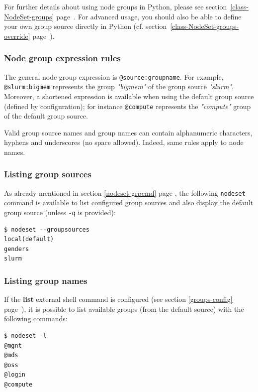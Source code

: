 \documentclass[english,a4paper]{csuserguide}
\newcommand{\nodeset}{\texttt{nodeset}\xspace}
\begin{document}
For further details about using node groups in Python, please see section~\ref{class-NodeSet-groups} page~\pageref{class-NodeSet-groups}. For advanced usage, you should also be able to define your own group source directly in Python (cf. section~\ref{class-NodeSet-groups-override} page~\pageref{class-NodeSet-groups-override}).

\subsubsection{Node group expression rules}
\label{nodeset-groupsexpr}

The general node group expression is \verb+@source:groupname+. For example, \verb+@slurm:bigmem+ represents the group \textit{"bigmem"} of the group source \textit{"slurm"}. Moreover, a shortened expression is available when using the default group source (defined by configuration); for instance \verb+@compute+ represents the \textit{"compute"} group of the default group source.

Valid group source names and group names can contain alphanumeric characters, hyphens and underscores (no space allowed). Indeed, same rules apply to node names.

\subsubsection{Listing group sources}
As already mentioned in section \ref{nodeset-grpcmd} page \pageref{nodeset-grpcmd}, the following \nodeset command is available to list configured group sources and also display the default group source (unless \verb+-q+ is provided):
\medskip
\begin{lstlisting}[breaklines=true, breakatwhitespace=true]
$ nodeset --groupsources
local(default)
genders
slurm
\end{lstlisting}

\pagebreak[2]

\subsubsection{Listing group names}
\label{nodeset-group-list}
If the \textbf{list} external shell command is configured (see section \ref{groups-config} page~\pageref{groups-config}), it is possible to list available groups (from the default source) with the following commands:
\medskip
\begin{lstlisting}[breaklines=true, breakatwhitespace=true]
$ nodeset -l
@mgnt
@mds
@oss
@login
@compute
\end{lstlisting}
\end{document}
